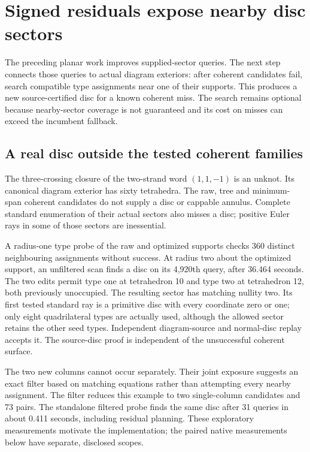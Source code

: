 \section{Signed residuals expose nearby disc sectors}
\label{sec:sector-windows}

The preceding planar work improves supplied-sector queries. The next step
connects those queries to actual diagram exteriors: after coherent candidates
fail, search compatible type assignments near one of their supports.
This produces a new source-certified disc for a known coherent miss.
The search remains optional because nearby-sector coverage is not guaranteed
and its cost on misses can exceed the incumbent fallback.

\subsection{A real disc outside the tested coherent families}

The three-crossing closure of the two-strand word $(1,1,-1)$ is an unknot.
Its canonical diagram exterior has sixty tetrahedra. The raw, tree and
minimum-span coherent candidates do not supply a disc or cappable annulus.
Complete standard enumeration of their actual sectors also misses a disc;
positive Euler rays in some of those sectors are inessential.

A radius-one type probe of the raw and optimized supports checks 360
distinct neighbouring assignments without success. At radius two about
the optimized support, an unfiltered scan finds a disc on its 4,920th
query, after 36.464 seconds. The two edits permit type one at tetrahedron
10 and type two at tetrahedron 12, both previously unoccupied. The resulting
sector has matching nullity two. Its first tested standard ray is a
primitive disc with every coordinate zero or one; only eight quadrilateral
types are actually used, although the allowed sector retains the other
seed types. Independent diagram-source and normal-disc replay accepts it.
The source-disc proof is independent of the unsuccessful coherent surface.

The two new columns cannot occur separately. Their joint exposure suggests
an exact filter based on matching equations rather than attempting every
nearby assignment. The filter reduces this example to two single-column
candidates and 73 pairs. The standalone filtered probe finds the same disc
after 31 queries in about 0.411 seconds, including residual planning.
These exploratory measurements motivate the implementation; the paired
native measurements below have separate, disclosed scopes.

